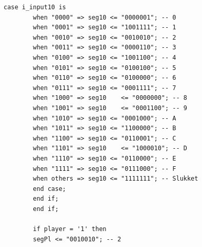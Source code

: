 \begin{enumerate}
\begin{lstlisting}[caption={Behavioral style kode for Guessgame},label={lst:Guessgame2pl}]
		case i_input10 is
		when "0000" => seg10 <= "0000001"; -- 0
		when "0001" => seg10 <= "1001111"; -- 1
		when "0010" => seg10 <= "0010010"; -- 2
		when "0011" => seg10 <= "0000110"; -- 3
		when "0100" => seg10 <= "1001100"; -- 4
		when "0101" => seg10 <= "0100100"; -- 5
		when "0110" => seg10 <= "0100000"; -- 6
		when "0111" => seg10 <= "0001111"; -- 7
		when "1000" => seg10	<= "0000000"; -- 8
		when "1001" => seg10	<= "0001100"; -- 9
		when "1010" => seg10 <= "0001000"; -- A
		when "1011" => seg10 <= "1100000"; -- B
		when "1100" => seg10 <= "0110001"; -- C
		when "1101" => seg10	<= "1000010"; -- D
		when "1110" => seg10 <= "0110000"; -- E
		when "1111" => seg10 <= "0111000"; -- F
		when others => seg10 <= "1111111"; -- Slukket
		end case;
		end if;
		end if;
		
		if player = '1' then
		segPl <= "0010010"; -- 2
		

\end{lstlisting}
\end{enumerate}
